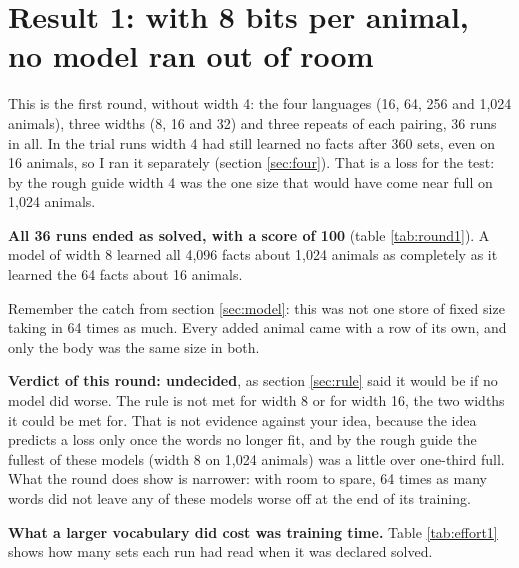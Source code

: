 \section{Result 1: with 8 bits per animal, no model ran out of room}\label{sec:round1}

This is the first round, without width 4: the four languages (16, 64, 256 and 1,024 animals),
three widths (8, 16 and 32) and three repeats of each pairing, 36 runs in all. In the trial
runs width 4 had still learned no facts after 360 sets, even on 16 animals, so I ran it
separately (section \ref{sec:four}). That is a loss for the test: by the rough guide width 4 was
the one size that would have come near full on 1,024 animals.

\begin{table}[H]
\centering\small

\caption{Facts known (0 to 100) at the end of each run, with 8 bits per animal. Each entry
covers three repeats; a single number means all three gave that score.}
\label{tab:round1}
\end{table}

\textbf{All 36 runs ended as solved, with a score of 100} (table \ref{tab:round1}). A model of
width 8 learned all 4,096 facts about 1,024 animals as completely as it learned the 64 facts
about 16 animals.

Remember the catch from section \ref{sec:model}: this was not one store of fixed size taking
in 64 times as much. Every added animal came with a row of its own, and only the body was the
same size in both.

\textbf{Verdict of this round: undecided}, as section \ref{sec:rule} said it would be if no
model did worse. The rule is not met for width 8 or for width 16, the two widths it could be
met for. That is not evidence against your idea, because the idea predicts a loss only once
the words no longer fit, and by the rough guide the fullest of these models (width 8 on 1,024
animals) was a little over one-third full. What the round does show is narrower: with room to
spare, 64 times as many words did not leave any of these models worse off at the end of its
training.

\textbf{What a larger vocabulary did cost was training time.} Table \ref{tab:effort1} shows
how many sets each run had read when it was declared solved.

\begin{table}[H]
\centering\small

\caption{Sets of training text read before each run was solved, for the three repeats,
smallest first. Runs are graded only after certain numbers of sets and must pass twice in a
row, so these figures move in jumps, and two equal figures may hide a real difference. The
figure 1,639 is the one run that was graded because its time had run out.}
\label{tab:effort1}
\end{table}


